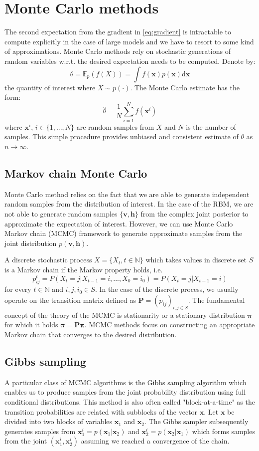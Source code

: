 \section{Monte Carlo methods}
The second expectation from the gradient in \ref{eq:gradient} is intractable to compute explicitly  in the case of large models and we have to resort to some kind of approximations. Monte Carlo methods rely on stochastic generations of random variables w.r.t. the desired expectation needs to be computed. Denote by:
$$ \theta = \mathbb{E}_p(f(X)) = \int f(\mathbf{x})p(\mathbf{x}) \text{d}\mathbf{x}$$
the quantity of interest where $X \sim p(\cdot)$. The Monte Carlo estimate has the form:
$$ \hat{\theta} = \frac{1}{N} \sum_{i=1}^N f(\mathbf{x}^i)$$
where $\mathbf{x}^i$, $i \in \{1,..., N\}$ are random samples from $X$ and $N$ is the number of samples. This simple procedure provides unbiased and consistent estimate of $\theta$ as $n \rightarrow \infty$.

\subsection{Markov chain Monte Carlo}
Monte Carlo method relies on the fact that we are able to generate independent random samples from the distribution of interest. In the case of the RBM, we are not able to generate random samples $\{ \mathbf{v,h} \}$ from the complex joint posterior to approximate the expectation of interest. However, we can use Monte Carlo Markov chain (MCMC) framework to generate approximate samples from the joint distribution $p( \mathbf{v,h} )$.

A discrete stochastic process $X = \{ X_t, t \in \mathbb{N} \}$ which takes values in discrete set $S$ is a Markov chain if the Markov property holds, i.e.
$$p_{ij}^t = P(X_t = j | X_{t-1} = i,  ..., X_{0} = i_0) = P(X_t = j | X_{t-1} = i)$$
for every $t \in \mathbb{N}$ and $i,j, i_0 \in S$. In the case of the discrete process, we usually operate on the transition matrix defined as $\mathbf{P} = (p_{ij})_{i,j \in S}$. The fundamental concept of the theory of the MCMC is stationarity or a stationary distribution $\mathbf{\pi}$ for which it holds $\mathbf{\pi} = \mathbf{P\pi}.$ MCMC methods focus on constructing an appropriate Markov chain that converges to the desired distribution.

\subsection{Gibbs sampling}
A particular class of MCMC algorithms is the Gibbs sampling algorithm which enables us to produce samples from the joint probability distribution using full conditional distributions. This method is also often called "block-at-a-time" as the transition probabilities are related with subblocks of the vector $\mathbf{x}$. Let $\mathbf{x}$ be divided into two blocks of variables $\mathbf{x}_1$ and $\mathbf{x}_2$. The Gibbs sampler subsequently generates samples from $\mathbf{x}_1^i = p(\mathbf{x}_1 | \mathbf{x}_2)$ and $\mathbf{x}_2^i = p(\mathbf{x}_2 | \mathbf{x}_1)$ which forms samples from the joint $(\mathbf{x}_1^i, \mathbf{x}_2^i)$ assuming we reached a convergence of the chain.
     
